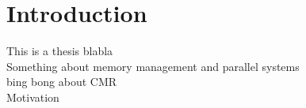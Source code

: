 \chapter{Introduction}

This is a thesis blabla
\\
Something about memory management and parallel systems
\\
bing bong about CMR
\\
Motivation
